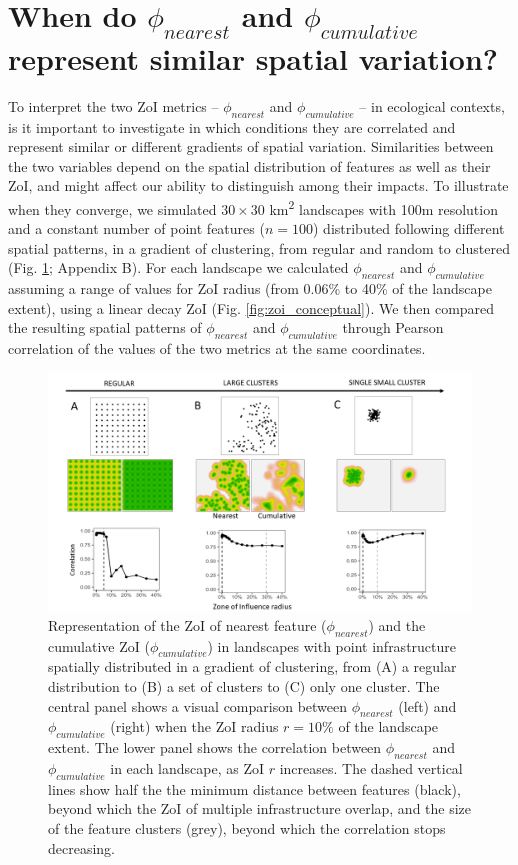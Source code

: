 \documentclass[titlepage]{article}
\begin{document}
\section{When do $\phi_{nearest}$ and $\phi_{cumulative}$ represent similar spatial variation?}

To interpret the two ZoI metrics -- $\phi_{nearest}$ and $\phi_{cumulative}$ -- in ecological contexts, is it important to investigate in which conditions they are correlated and represent similar or different gradients of spatial variation. Similarities between the two variables depend on the spatial distribution of features as well as their ZoI, and might affect our ability to distinguish among their impacts. To illustrate when they converge, we simulated $30 \times 30$ km\textsuperscript{2} landscapes with 100m resolution and a constant number of point features ($n = 100$) distributed following different spatial patterns, in a gradient of clustering, from regular and random to clustered (Fig. \ref{fig:simulated_landscapes}; Appendix B). For each landscape we calculated $\phi_{nearest}$ and $\phi_{cumulative}$ assuming a range of values for ZoI radius (from 0.06\% to 40\% of the landscape extent), using a linear decay ZoI (Fig. \ref{fig:zoi_conceptual}). We then compared the resulting spatial patterns of $\phi_{nearest}$ and $\phi_{cumulative}$ through Pearson correlation of the values of the two metrics at the same coordinates. 

\begin{figure}[h]
\centering
\includegraphics[width=1.3\textwidth,center]{figures/simulated_landscapes.png}
\caption{\label{fig:simulated_landscapes} Representation of the ZoI of nearest feature ($\phi_{nearest}$) and the cumulative ZoI ($\phi_{cumulative}$) in landscapes with point infrastructure spatially distributed in a gradient of clustering, from (A) a regular distribution to (B) a set of clusters to (C) only one cluster. 
The central panel shows a visual comparison between $\phi_{nearest}$ (left) and $\phi_{cumulative}$ (right) when the ZoI radius $r = 10\%$ of the landscape extent. The lower panel shows the correlation between $\phi_{nearest}$ and $\phi_{cumulative}$ in each landscape, as ZoI $r$ increases. The dashed vertical lines show half the the minimum distance between features (black), beyond which the ZoI of multiple infrastructure overlap, and the size of the feature clusters (grey), beyond which the correlation stops decreasing.}
\end{figure}
\end{document}
